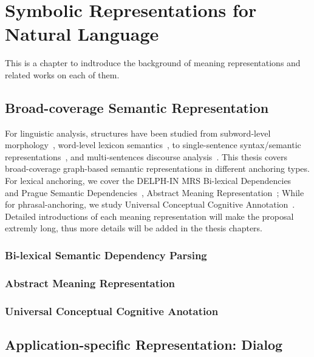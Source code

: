 \section{Symbolic Representations for Natural Language}
\label{sec:bg:symbolic}

This is a chapter to indtroduce the background of meaning representations and related works on each of them.

\subsection{Broad-coverage Semantic Representation}
\label{ssec:bg:broad-mr}

For linguistic analysis, structures have been studied from
subword-level morphology~\cite{beesley2003finite}, word-level lexicon
semantics~\cite{miller1998wordnet}, to single-sentence syntax/semantic
representations~\cite{baker1998berkeley,palmer2005proposition,collins2003head},
and multi-sentences discourse
analysis~\cite{carlson2003building,wolf2005representing,prasad2008penn}. This
thesis covers broad-coverage graph-based semantic representations in
different anchoring types. For lexical anchoring, we cover the
DELPH-IN MRS Bi-lexical Dependencies~\cite[DM,][]{ivanova2012did} and
Prague Semantic
Dependencies~\cite[PSD,][]{hajic2012announcing,miyao2014house},
Abstract Meaning Representation~\cite[AMR,][]{Ban:Bon:Cai:13}; While
for phrasal-anchoring, we study Universal Conceptual Cognitive
Annotation~\cite[UCCA,][]{Abe:Rap:13b}. Detailed introductions of each
meaning representation will make the proposal extremly long, thus more
details will be added in the thesis chapters.


\subsubsection{Bi-lexical Semantic Dependency Parsing}

\subsubsection{Abstract Meaning Representation}

\subsubsection{Universal Conceptual Cognitive Anotation}

\subsection{Application-specific Representation: Dialog}

